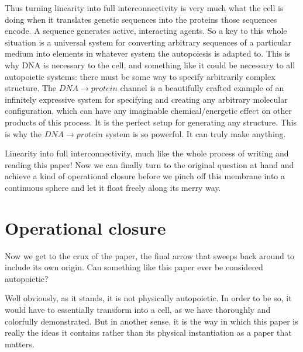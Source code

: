 \documentclass[12pt]{scrartcl}
\begin{document}
Thus turning linearity into full interconnectivity is very much what the cell is doing when it translates genetic sequences into the proteins those sequences encode.  A sequence generates active, interacting agents.  So a key to this whole situation is a universal system for converting arbitrary sequences of a particular medium into elements in whatever system the autopoiesis is adapted to.  This is why DNA is necessary to the cell, and something like it could be necessary to all autopoietic systems: there must be some way to specify arbitrarily complex structure.  The $DNA \rightarrow protein$ channel is a beautifully crafted example of an infinitely expressive system for specifying and creating any arbitrary molecular configuration, which can have any imaginable chemical/energetic effect on other products of this process.  It is the perfect setup for generating any structure.  This is why the $DNA \rightarrow protein$ system is so powerful.  It can truly make anything.  

Linearity into full interconnectivity, much like the whole process of writing and reading this paper!  Now we can finally turn to the original question at hand and achieve a kind of operational closure before we pinch off this membrane into a continuous sphere and let it float freely along its merry way.  

\section{Operational closure}

Now we get to the crux of the paper, the final arrow that sweeps back around to include its own origin.  Can something like this paper ever be considered autopoietic?  

Well obviously, as it stands, it is not physically autopoietic.  In order to be so, it would have to essentially transform into a cell, as we have thoroughly and colorfully demonstrated.  But in another sense, it is the way in which this paper is really the ideas it contains rather than its physical instantiation as a paper that matters.  
\end{document}
